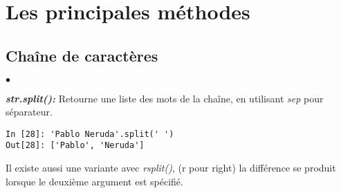 \documentclass[10pt,dvipsnames,  dvips]{article}
\begin{document}
\newpage
\section{Les principales méthodes}
\subsection{Chaîne de caractères}

\begin{list}{$\bullet$}{}
\item \textit{\textbf{str.split(): }} Retourne une liste des mots de la chaîne, en utilisant \textit{sep} pour séparateur.


\begin{lstlisting}
In [28]: 'Pablo Neruda'.split(' ')
Out[28]: ['Pablo', 'Neruda']
\end{lstlisting}

Il existe aussi une variante avec  \textit{rsplit()}, (r pour right) la différence  se produit lorsque le deuxième argument est spécifié.


\end{list}
\end{document}
